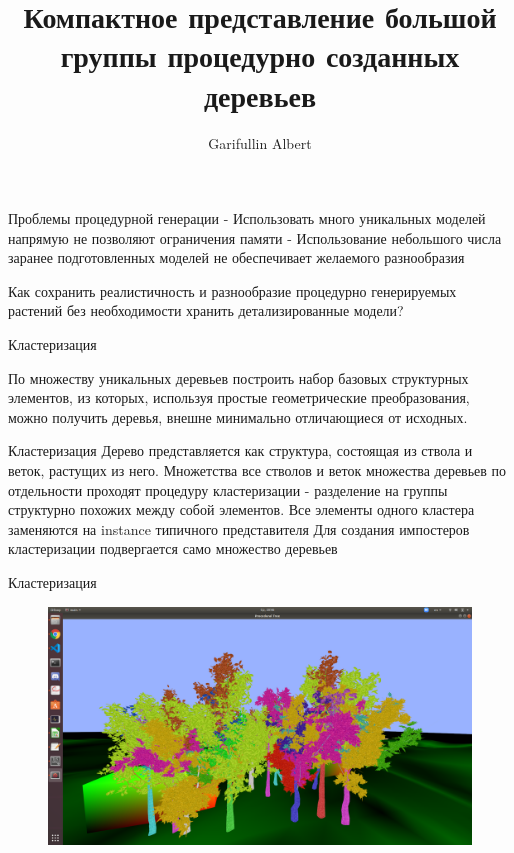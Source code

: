 \documentclass[14pt]{beamer}
\author{Garifullin Albert}
\title{Компактное представление большой группы процедурно созданных деревьев}
\begin{document}
\begin{frame}
\titlepage
\end{frame}

  
\begin{frame}{Проблемы процедурной генерации}
 - Использовать много уникальных моделей напрямую не позволяют ограничения
   памяти\linebreak	
 - Использование небольшого числа заранее подготовленных моделей не обеспечивает желаемого разнообразия\linebreak	
 
 Как сохранить реалистичность и разнообразие процедурно генерируемых растений без необходимости хранить детализированные модели?
\end{frame}
\begin{frame}{Кластеризация}

По множеству уникальных деревьев построить набор базовых структурных элементов, из которых, используя простые геометрические преобразования, можно получить деревья, внешне минимально отличающиеся от исходных.
\end{frame}
\begin{frame}{Кластеризация}
Дерево представляется как структура, состоящая из ствола и веток, растущих из него. \linebreak	
Множетства все стволов и веток множества деревьев по отдельности проходят процедуру кластеризации - разделение на группы структурно похожих между собой элементов.\linebreak	
Все элементы одного кластера заменяются на instance типичного представителя\linebreak	
Для создания импостеров кластеризации подвергается само множество деревьев\linebreak	
\end{frame}
\begin{frame}{Кластеризация}
\begin{figure}[hbtp]
\includegraphics[scale=0.165]{clusters.png}
\end{figure}
\end{frame}
\end{document}
